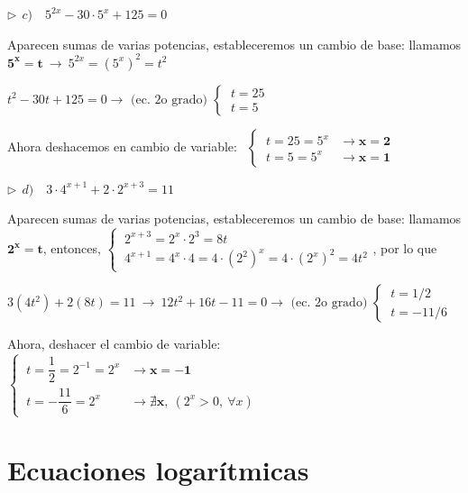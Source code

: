 \begin{miejercicio}
\vspace{5mm} $\triangleright \ \ c)\quad 5^{2x}-30\cdot 5^x+125=0$

\vspace{2mm} Aparecen sumas de varias potencias, estableceremos un cambio de base: llamamos  $\boldsymbol{5^x=t}\ \to \ 5^{2x}=(5^x)^2=t^2$

\vspace{2mm} $t^2-30t+125=0 \to \text{ (ec. 2o grado) }\begin{cases}  \ t=25 \\ \ t=5 \end{cases}$

\vspace{2mm} Ahora deshacemos en cambio de variable: $\ \ \begin{cases} \ t=25=5^x & \to \boldsymbol{x=2} \\ \ t=5 =5^x &\to \boldsymbol{x=1} \end{cases}$ 

\vspace{5mm} $\triangleright \ \ d)\quad 3\cdot 4^{x+1}+2\cdot 2^{x+3}=11$

\vspace{2mm} Aparecen sumas de varias potencias, estableceremos un cambio de base: llamamos $\boldsymbol{2^x=t}$, entonces, $\begin{cases} \ 2^{x+3}=2^x\cdot 2^3=8t \\ \ 4^{x+1}=4^x\cdot 4=4\cdot(2^2)^x=4\cdot (2^x)^2=4t^2 \end{cases}$, por lo que

\vspace{2mm} $3(4t^2)+2(8t)=11\ \to \ 12t^2+16t-11=0 \to \text{ (ec. 2o grado) }\begin{cases}  \ t=1/2 \\ \ t=-11/6 \end{cases}$


\vspace{2mm} Ahora, deshacer el cambio de variable: $\begin{cases}
\ t=\dfrac 1 2 = 2^{-1}=2^x	 &\to \boldsymbol{x=-1} \\
\ t=-\dfrac{11}{6}=2^x &\to \boldsymbol{\nexists x }, \ (2^x>0,\ \forall x)
\end{cases}$
\end{miejercicio}



\vspace{1cm}
\section{Ecuaciones logarítmicas}
\vspace{0.5cm}


